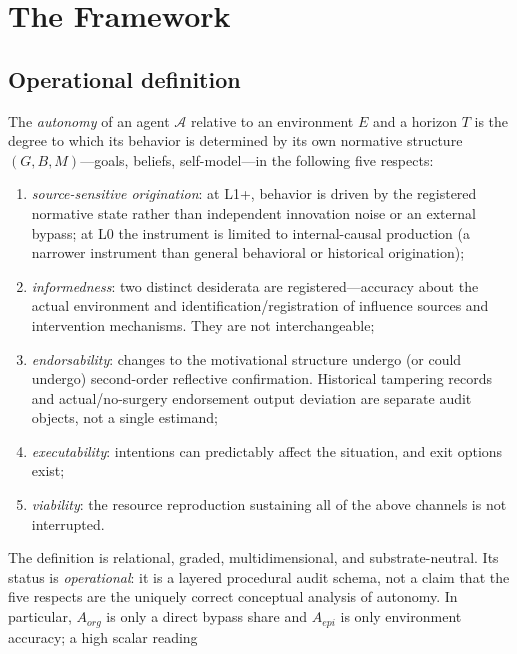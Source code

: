 \section{The Framework}\label{sec:framework}

\subsection{Operational definition}

\begin{definition}\label{def:autonomy}
The \emph{autonomy} of an agent $\mathcal{A}$ relative to an environment $E$
and a horizon $T$ is the degree to which its behavior is determined by its own
normative structure $(G,B,M)$---goals, beliefs, self-model---in the following
five respects:
\begin{enumerate}
\item \emph{source-sensitive origination}: at L1+, behavior is driven by the
registered normative state rather than independent innovation noise or an
external bypass; at L0 the instrument is limited to internal-causal production
(a narrower instrument than general behavioral or historical origination);
\item \emph{informedness}: two distinct desiderata are registered---accuracy
about the actual environment and identification/registration of influence
sources and intervention mechanisms. They are not interchangeable;
\item \emph{endorsability}: changes to the motivational structure undergo (or
could undergo) second-order reflective confirmation. Historical tampering
records and actual/no-surgery endorsement output deviation are separate audit
objects, not a single estimand;
\item \emph{executability}: intentions can predictably affect the situation,
and exit options exist;
\item \emph{viability}: the resource reproduction sustaining all of the above
channels is not interrupted.
\end{enumerate}
The definition is relational, graded, multidimensional, and
substrate-neutral. Its status is \emph{operational}: it is a layered procedural
audit schema, not a claim that the five respects are the uniquely correct
conceptual analysis of autonomy. In particular, $A_{org}$ is only a direct
bypass share and $A_{epi}$ is only environment accuracy; a high scalar reading

\end{definition}
